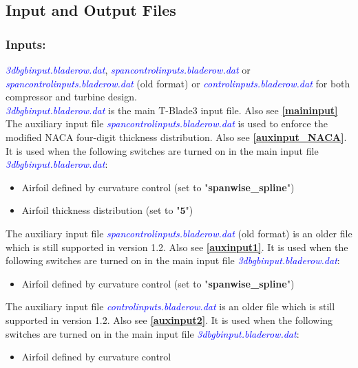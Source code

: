 \documentclass[8pt]{article}
\begin{document}
\subsection{Input and Output Files}\label{inputoutput}
\subsubsection{Inputs:}\label{inputs}
\noindent
\textit{\textcolor{blue}{3dbgbinput.bladerow.dat}}, \textit{\textcolor{blue}{spancontrolinputs.bladerow.dat}} or \textit{\textcolor{blue}{spancontrolinputs.bladerow.dat}} (old format) or \textit{\textcolor{blue}{controlinputs.bladerow.dat}} for both compressor and turbine design.\\

\noindent
\textit{\textcolor{blue}{3dbgbinput.bladerow.dat}} is the main T-Blade3 input file. Also see \textbf{\ref{maininput}}\\ 

\noindent
The auxiliary input file \textit{\textcolor{blue}{spancontrolinputs.bladerow.dat}} is used to enforce the modified NACA four-digit thickness distribution. Also see \textbf{\ref{auxinput_NACA}}. It is used when the following switches are turned on in the main input file \textit{\textcolor{blue}{3dbgbinput.bladerow.dat}}:
\begin{itemize}
    \item Airfoil defined by curvature control (set to "\textbf{spanwise\_spline}")
    \item Airfoil thickness distribution (set to "$\mathbf{5}$")
\end{itemize}

\noindent
The auxiliary input file \textit{\textcolor{blue}{spancontrolinputs.bladerow.dat}} (old format) is an older file which is still supported in version 1.2. Also see \textbf{\ref{auxinput1}}. It is used when the following switches are turned on in the main input file \textit{\textcolor{blue}{3dbgbinput.bladerow.dat}}:
\begin{itemize}
    \item Airfoil defined by curvature control (set to "\textbf{spanwise\_spline}")
\end{itemize}

\noindent 
The auxiliary input file \textit{\textcolor{blue}{controlinputs.bladerow.dat}} is an older file which is still supported in version 1.2. Also see \textbf{\ref{auxinput2}}. It is used when the following switches are turned on in the main input file \textit{\textcolor{blue}{3dbgbinput.bladerow.dat}}:
\begin{itemize}
    \item Airfoil defined by curvature control 
\end{itemize}
\end{document}
